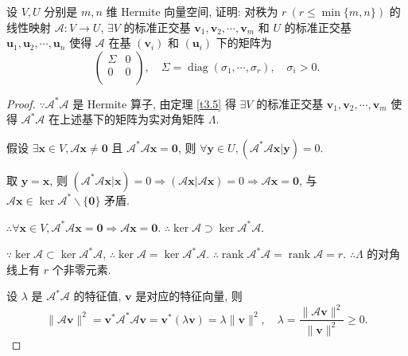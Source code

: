 \documentclass{ctexart}
\begin{document}
\begin{exercise}[补充题 4]
    设 $V,U$ 分别是 $m,n$ 维 Hermite 向量空间, 证明: 对秩为 $r\ (r\leq\min\{m,n\})$ 的线性映射 $\mathcal{A}:V\to U$, $\exists V$ 的标准正交基 $\boldsymbol{v}_1,\boldsymbol{v}_2,\cdots,\boldsymbol{v}_m$ 和 $U$ 的标准正交基 $\boldsymbol{u}_1,\boldsymbol{u}_2,\cdots,\boldsymbol{u}_n$ 使得 $\mathcal{A}$ 在基 $(\boldsymbol{v}_i)$ 和 $(\boldsymbol{u}_i)$ 下的矩阵为
    \[\begin{pmatrix}
        \Sigma & 0 \\
        0 & 0 \\
    \end{pmatrix},\quad\Sigma=\operatorname{diag}(\sigma_1,\cdots,\sigma_r),\quad\sigma_i>0.\]
\end{exercise}
\begin{proof}
    $\because\mathcal{A}^*\mathcal{A}$ 是 Hermite 算子, 由定理 \ref{t3.5} 得 $\exists V$ 的标准正交基 $\boldsymbol{v}_1,\boldsymbol{v}_2,\cdots,\boldsymbol{v}_m$ 使得 $\mathcal{A}^*\mathcal{A}$ 在上述基下的矩阵为实对角矩阵 $\Lambda$.

    假设 $\exists\boldsymbol{x}\in V,\mathcal{A}\boldsymbol{x}\neq\boldsymbol{0}$ 且 $\mathcal{A}^*\mathcal{A}\boldsymbol{x}=\boldsymbol{0}$, 则 $\forall\boldsymbol{y}\in U,(\mathcal{A}^*\mathcal{A}\boldsymbol{x}|\boldsymbol{y})=0$.

    取 $\boldsymbol{y}=\boldsymbol{x}$, 则 $(\mathcal{A}^*\mathcal{A}\boldsymbol{x}|\boldsymbol{x})=0\Rightarrow(\mathcal{A}\boldsymbol{x}|\mathcal{A}\boldsymbol{x})=0\Rightarrow\mathcal{A}\boldsymbol{x}=\boldsymbol{0}$, 与 $\mathcal{A}\boldsymbol{x}\in\ker\mathcal{A}^*\backslash\{\boldsymbol{0}\}$ 矛盾.
    
    $\therefore\forall\boldsymbol{x}\in V,\mathcal{A}^*\mathcal{A}\boldsymbol{x}=\boldsymbol{0}\Rightarrow\mathcal{A}\boldsymbol{x}=\boldsymbol{0}$. $\therefore\ker\mathcal{A}\supset\ker\mathcal{A}^*\mathcal{A}$.

    $\because\ker\mathcal{A}\subset\ker\mathcal{A}^*\mathcal{A}$, $\therefore\ker\mathcal{A}=\ker\mathcal{A}^*\mathcal{A}$. $\therefore\operatorname{rank}\mathcal{A}^*\mathcal{A}=\operatorname{rank}\mathcal{A}=r$. $\therefore\Lambda$ 的对角线上有 $r$ 个非零元素.

    设 $\lambda$ 是 $\mathcal{A}^*\mathcal{A}$ 的特征值, $\boldsymbol{v}$ 是对应的特征向量, 则
    \[\|\mathcal{A}\boldsymbol{v}\|^2=\boldsymbol{v}^*\mathcal{A}^*\mathcal{A}\boldsymbol{v}=\boldsymbol{v}^*(\lambda\boldsymbol{v})=\lambda\|\boldsymbol{v}\|^2,\quad\lambda=\dfrac{\|\mathcal{A}\boldsymbol{v}\|^2}{\|\boldsymbol{v}\|^2}\geq0.\]


\end{proof}
\end{document}
